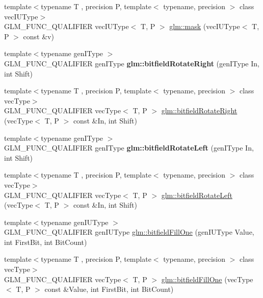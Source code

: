 \begin{DoxyCompactItemize}
\item 
{\footnotesize template$<$typename T , precision P, template$<$ typename, precision $>$ class vec\+I\+U\+Type$>$ }\\G\+L\+M\+\_\+\+F\+U\+N\+C\+\_\+\+Q\+U\+A\+L\+I\+F\+I\+ER vec\+I\+U\+Type$<$ T, P $>$ \hyperlink{group__gtc__bitfield_ga073dbd8642f550b51da3572541431c1c}{glm\+::mask} (vec\+I\+U\+Type$<$ T, P $>$ const \&v)
\item 
\mbox{\label{bitfield_8inl_a29f065281c52cf3ca7695e71504687fc}} 
{\footnotesize template$<$typename gen\+I\+Type $>$ }\\G\+L\+M\+\_\+\+F\+U\+N\+C\+\_\+\+Q\+U\+A\+L\+I\+F\+I\+ER gen\+I\+Type {\bfseries glm\+::bitfield\+Rotate\+Right} (gen\+I\+Type In, int Shift)
\item 
{\footnotesize template$<$typename T , precision P, template$<$ typename, precision $>$ class vec\+Type$>$ }\\G\+L\+M\+\_\+\+F\+U\+N\+C\+\_\+\+Q\+U\+A\+L\+I\+F\+I\+ER vec\+Type$<$ T, P $>$ \hyperlink{group__gtc__bitfield_ga96b56fd2adad1eeaee9e10dfe83904ba}{glm\+::bitfield\+Rotate\+Right} (vec\+Type$<$ T, P $>$ const \&In, int Shift)
\item 
\mbox{\label{bitfield_8inl_ae088d9983f8cb8fcf0aacae4ae51462a}} 
{\footnotesize template$<$typename gen\+I\+Type $>$ }\\G\+L\+M\+\_\+\+F\+U\+N\+C\+\_\+\+Q\+U\+A\+L\+I\+F\+I\+ER gen\+I\+Type {\bfseries glm\+::bitfield\+Rotate\+Left} (gen\+I\+Type In, int Shift)
\item 
{\footnotesize template$<$typename T , precision P, template$<$ typename, precision $>$ class vec\+Type$>$ }\\G\+L\+M\+\_\+\+F\+U\+N\+C\+\_\+\+Q\+U\+A\+L\+I\+F\+I\+ER vec\+Type$<$ T, P $>$ \hyperlink{group__gtc__bitfield_ga410d130917d85b865718e3ebc32cf0ef}{glm\+::bitfield\+Rotate\+Left} (vec\+Type$<$ T, P $>$ const \&In, int Shift)
\item 
{\footnotesize template$<$typename gen\+I\+U\+Type $>$ }\\G\+L\+M\+\_\+\+F\+U\+N\+C\+\_\+\+Q\+U\+A\+L\+I\+F\+I\+ER gen\+I\+U\+Type \hyperlink{group__gtc__bitfield_ga46f9295abe3b5c7658f5b13c7f819f0a}{glm\+::bitfield\+Fill\+One} (gen\+I\+U\+Type Value, int First\+Bit, int Bit\+Count)
\item 
{\footnotesize template$<$typename T , precision P, template$<$ typename, precision $>$ class vec\+Type$>$ }\\G\+L\+M\+\_\+\+F\+U\+N\+C\+\_\+\+Q\+U\+A\+L\+I\+F\+I\+ER vec\+Type$<$ T, P $>$ \hyperlink{group__gtc__bitfield_gad789042e84e8292ae95dc1af856f2ad5}{glm\+::bitfield\+Fill\+One} (vec\+Type$<$ T, P $>$ const \&Value, int First\+Bit, int Bit\+Count)

\end{DoxyCompactItemize}
